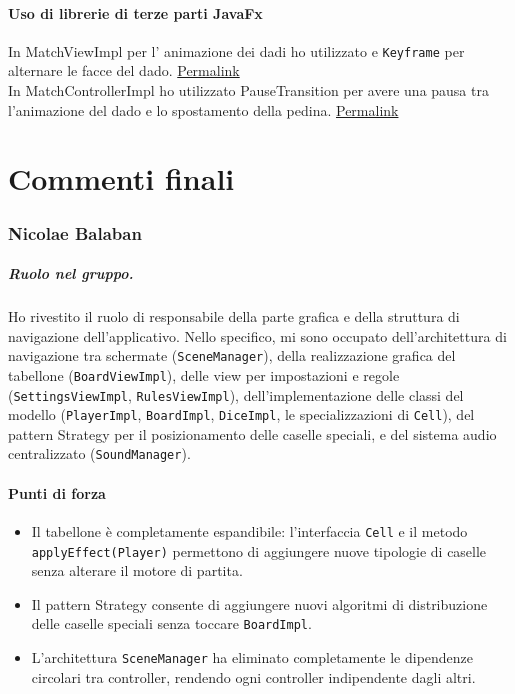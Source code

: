 \documentclass[a4paper,12pt]{report}
\begin{document}
\subsubsection{Uso di librerie di terze parti JavaFx}
In MatchViewImpl per l' animazione dei dadi ho utilizzato  e \texttt{Keyframe} per alternare le facce del dado.
\href{https://github.com/Nick-2002b/PSS25-Gioco-Oca/blob/e81943445d44f9befaaf74b02e1793cb20d0ce74/src/main/java/it/unibo/giocooca/view/impl/MatchViewImpl.java#L224-L235}{Permalink}\\
In MatchControllerImpl ho utilizzato PauseTransition per avere una pausa tra l'animazione del dado e lo spostamento della pedina.
\href{https://github.com/Nick-2002b/PSS25-Gioco-Oca/blob/e81943445d44f9befaaf74b02e1793cb20d0ce74/src/main/java/it/unibo/giocooca/controller/impl/MatchControllerImpl.java#L96}{Permalink}\\

\chapter{Commenti finali}

\subsection{Nicolae Balaban}
\paragraph{Ruolo nel gruppo.}Ho rivestito il ruolo di responsabile della parte grafica e della struttura di navigazione dell'applicativo. Nello specifico, mi sono occupato dell'architettura di navigazione tra schermate (\texttt{SceneManager}), della realizzazione grafica del tabellone (\texttt{BoardViewImpl}), delle view per impostazioni e regole (\texttt{SettingsViewImpl}, \texttt{RulesViewImpl}), dell'implementazione delle classi del modello (\texttt{PlayerImpl}, \texttt{BoardImpl}, \texttt{DiceImpl}, le specializzazioni di \texttt{Cell}), del pattern Strategy per il posizionamento delle caselle speciali, e del sistema audio centralizzato (\texttt{SoundManager}).

\subsubsection{Punti di forza}
\begin{itemize}
    \item Il tabellone è completamente espandibile: l'interfaccia \texttt{Cell} e il metodo \texttt{applyEffect(Player)} permettono di aggiungere nuove tipologie di caselle senza alterare il motore di partita.
    \item Il pattern Strategy consente di aggiungere nuovi algoritmi di distribuzione delle caselle speciali senza toccare \texttt{BoardImpl}.
    \item L'architettura \texttt{SceneManager} ha eliminato completamente le dipendenze circolari tra controller, rendendo ogni controller indipendente dagli altri.
\end{itemize}
\end{document}
